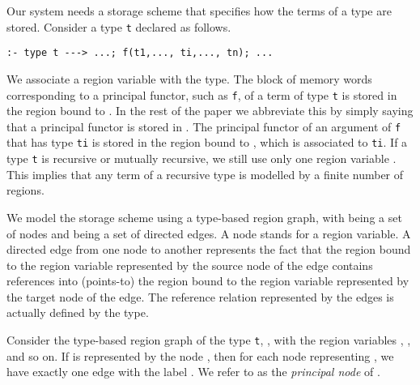 \documentclass{tlp}
\newcommand{\code}[1]{{\tt#1}}
\begin{document}
Our system needs a storage scheme
that specifies how the terms of a type are stored.
Consider a type \code{t} declared as follows.
\begin{verbatim}
:- type t ---> ...; f(t1,..., ti,..., tn); ...
\end{verbatim}
We associate a region variable  with the type.
The block of memory words corresponding to a principal functor,
such as \code{f}, of a term of type \code{t}
is stored in the region bound to .
In the rest of the paper we abbreviate this by simply saying that
a principal functor is stored in .
The principal functor of an argument of \code{f} that has type \code{ti}
is stored in the region bound to ,
which is associated to \code{ti}.
If a type \code{t} is recursive or mutually recursive,
we still use only one region variable .
This implies that any term of a recursive type
is modelled by a finite number of regions.

We model the storage scheme using a type-based region graph,
 with  being a set of nodes and  being a set of directed edges.
A node stands for a region variable.
A directed edge from one node to another represents the fact that
the region bound to the region variable
represented by the source node of the edge
contains references into (points-to)
the region bound to the region variable
represented by the target node of the edge.
The reference relation represented by the edges
is actually defined by the type.

Consider the type-based region graph of the type \code{t}, ,
with the region variables , ,  and so on.
If  is represented by the node ,
then for each node  representing ,
we have exactly one edge  with the label .
We refer to  as the \emph{principal node} of .
\end{document}
